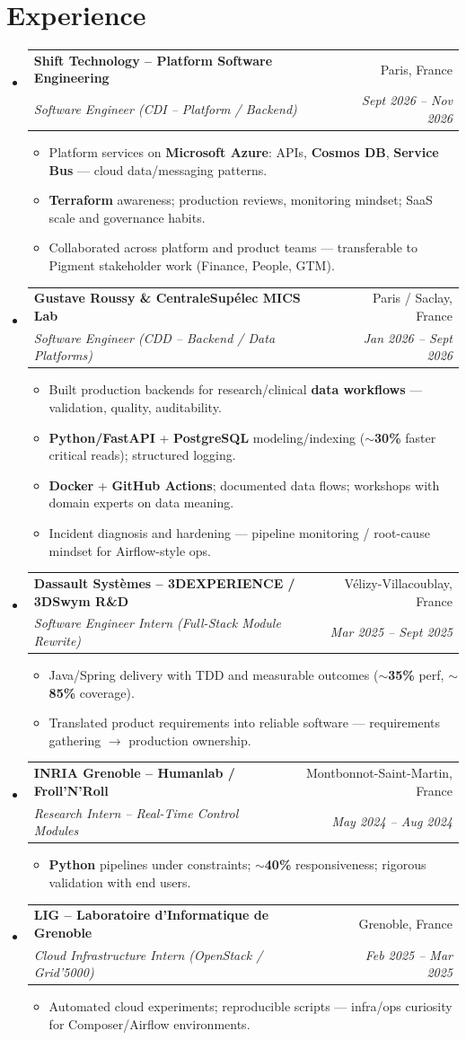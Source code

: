 \documentclass[letterpaper,10.5pt]{article}
\makeatletter
\newcommand{\resumeItem}[1]{\item\small{#1 \vspace{-1.5pt}}}
\newcommand{\resumeSubheading}[4]{\vspace{-1pt}\item\begin{tabular*}{0.97\textwidth}[t]{l@{\extracolsep{\fill}}r}\textbf{#1} & #2 \\\textit{\small#3} & \textit{\small #4} \\\end{tabular*}\vspace{-5pt}}
\newcommand{\resumeSubHeadingListStart}{\begin{itemize}[leftmargin=0.15in, label={}]}
\newcommand{\resumeSubHeadingListEnd}{\end{itemize}}
\newcommand{\resumeItemListStart}{\begin{itemize}[leftmargin=0.18in]}
\newcommand{\resumeItemListEnd}{\end{itemize}\vspace{-3pt}}
\makeatother
\begin{document}
\section{Experience}
\resumeSubHeadingListStart
  \resumeSubheading
    {Shift Technology -- Platform Software Engineering}{Paris, France}
    {Software Engineer (CDI -- Platform / Backend)}{Sept 2026 -- Nov 2026}
    \resumeItemListStart
      \resumeItem{Platform services on \textbf{Microsoft Azure}: APIs, \textbf{Cosmos DB}, \textbf{Service Bus} --- cloud data/messaging patterns.}
      \resumeItem{\textbf{Terraform} awareness; production reviews, monitoring mindset; SaaS scale and governance habits.}
      \resumeItem{Collaborated across platform and product teams --- transferable to Pigment stakeholder work (Finance, People, GTM).}
    \resumeItemListEnd
  \resumeSubheading
    {Gustave Roussy \& CentraleSup\'elec MICS Lab}{Paris / Saclay, France}
    {Software Engineer (CDD -- Backend / Data Platforms)}{Jan 2026 -- Sept 2026}
    \resumeItemListStart
      \resumeItem{Built production backends for research/clinical \textbf{data workflows} --- validation, quality, auditability.}
      \resumeItem{\textbf{Python/FastAPI} + \textbf{PostgreSQL} modeling/indexing (\textbf{$\sim$30\%} faster critical reads); structured logging.}
      \resumeItem{\textbf{Docker} + \textbf{GitHub Actions}; documented data flows; workshops with domain experts on data meaning.}
      \resumeItem{Incident diagnosis and hardening --- pipeline monitoring / root-cause mindset for Airflow-style ops.}
    \resumeItemListEnd
  \resumeSubheading
    {Dassault Syst\`emes -- 3DEXPERIENCE / 3DSwym R\&D}{V\'elizy-Villacoublay, France}
    {Software Engineer Intern (Full-Stack Module Rewrite)}{Mar 2025 -- Sept 2025}
    \resumeItemListStart
      \resumeItem{Java/Spring delivery with TDD and measurable outcomes (\textbf{$\sim$35\%} perf, \textbf{$\sim$85\%} coverage).}
      \resumeItem{Translated product requirements into reliable software --- requirements gathering $\rightarrow$ production ownership.}
    \resumeItemListEnd
  \resumeSubheading
    {INRIA Grenoble -- Humanlab / Froll'N'Roll}{Montbonnot-Saint-Martin, France}
    {Research Intern -- Real-Time Control Modules}{May 2024 -- Aug 2024}
    \resumeItemListStart
      \resumeItem{\textbf{Python} pipelines under constraints; \textbf{$\sim$40\%} responsiveness; rigorous validation with end users.}
    \resumeItemListEnd
  \resumeSubheading
    {LIG -- Laboratoire d'Informatique de Grenoble}{Grenoble, France}
    {Cloud Infrastructure Intern (OpenStack / Grid'5000)}{Feb 2025 -- Mar 2025}
    \resumeItemListStart
      \resumeItem{Automated cloud experiments; reproducible scripts --- infra/ops curiosity for Composer/Airflow environments.}
    \resumeItemListEnd
\resumeSubHeadingListEnd
\end{document}
